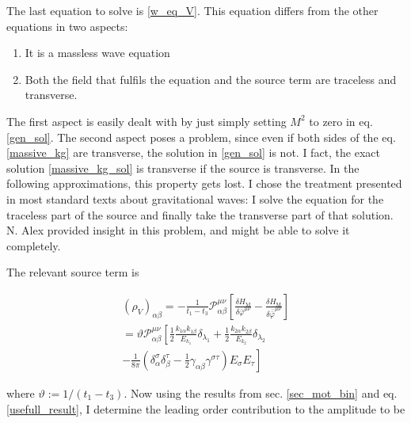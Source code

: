 \documentclass[11pt]{article}
\begin{document}
The last equation to solve is \ref{w_eq_V}. This equation differs from the other equations in two aspects:

\begin{enumerate}
	\item It is a massless wave equation
	\item Both the field that fulfils the equation and the source term are traceless and transverse.
\end{enumerate}

The first aspect is easily dealt with by just simply setting $M^2$ to zero in eq. \ref{gen_sol}. The second aspect poses a problem, since even if both sides of the eq. \ref{massive_kg} are transverse, the solution in \ref{gen_sol} is not. I fact, the exact solution \ref{massive_kg_sol} is transverse if the source is transverse. In the following approximations, this property gets lost. I chose the treatment presented in most standard texts about gravitational waves: I solve the equation for the traceless part of the source and  finally take the transverse part of that solution. N. Alex provided insight in this problem, and might be able to solve it completely.

The relevant source term is

\begin{multline}
	\left( \rho_V \right)_{\alpha \beta}
	= - \frac{1}{t_1 - t_3}
	\mathcal{P}_{\alpha \beta}^{\mu \nu}
	\left[ 
		\frac{
			\delta H_{\text{M}}
		}{
			\delta \bar{\varphi}^{\mu \nu}
		}
		-
		\frac{
			\delta H_{\text{M}}
		}{
			\delta \bar{\bar{\varphi}}^{\mu \nu}
		}
	\right]\\
	=
	\vartheta
	\mathcal{P}_{\alpha \beta}^{\mu \nu} 
	\left[
	\frac{1}{2} \frac{k_{1 \alpha} k_{1 \beta}}{E_{k_1}} \delta_{\lambda_1} 
	+
	\frac{1}{2} \frac{k_{2 \alpha} k_{2 \beta}}{E_{k_2}} \delta_{\lambda_2} 
	\right.
	\\
	\left.
	- \frac{1}{8 \pi} 
	\left( \delta_\alpha^\sigma \delta^\tau_\beta - \frac{1}{2} \gamma_{\alpha \beta} \gamma^{\sigma \tau} \right) 
	E_{\sigma} E_{\tau}
	\right]
\end{multline}

where $\vartheta := 1 / \left( t_1 - t_3 \right)$. Now using the results from sec. \ref{sec_mot_bin} and eq. \ref{usefull_result}, I determine the leading order contribution to the amplitude to be
\end{document}
